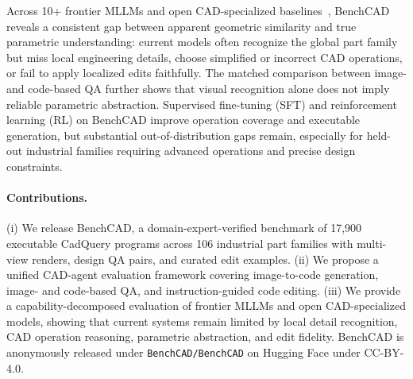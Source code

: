 Across 10+ frontier MLLMs and open CAD-specialized baselines~\citep{Kolodiazhnyi2026,Elistratov2026}, BenchCAD reveals a consistent gap between apparent geometric similarity and true parametric understanding: current models often recognize the global part family but miss local engineering details, choose simplified or incorrect CAD operations, or fail to apply localized edits faithfully.
The matched comparison between image- and code-based QA further shows that visual recognition alone does not imply reliable parametric abstraction.
Supervised fine-tuning (SFT) and reinforcement learning (RL) on BenchCAD improve operation coverage and executable generation, but substantial out-of-distribution gaps remain, especially for held-out industrial families requiring advanced operations and precise design constraints.

\paragraph{Contributions.}
(i) We release BenchCAD, a domain-expert-verified benchmark of 17{,}900 executable CadQuery programs across 106 industrial part families with multi-view renders, design QA pairs, and curated edit examples.
(ii) We propose a unified CAD-agent evaluation framework covering image-to-code generation, image- and code-based QA, and instruction-guided code editing.
(iii) We provide a capability-decomposed evaluation of frontier MLLMs and open CAD-specialized models, showing that current systems remain limited by local detail recognition, CAD operation reasoning, parametric abstraction, and edit fidelity.
BenchCAD is anonymously released under \texttt{BenchCAD/BenchCAD} on Hugging Face under CC-BY-4.0.
